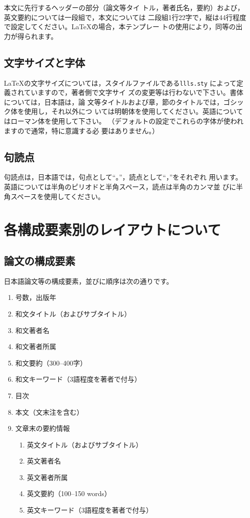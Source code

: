 \documentclass[b5paper,10pt,twocolumn,tombow]{jarticle}
\begin{document}
本文に先行するヘッダーの部分（論文等タイ
トル，著者氏名，要約）および，英文要約については一段組で，本文については
二段組1行22字で，縦は44行程度で設定してください。\LaTeX{}の場合，本テンプレー
トの使用により，同等の出力が得られます。


\subsection{文字サイズと字体}
\LaTeX{}の文字サイズについては，スタイルファイルである\texttt{llls.sty}
によって定義されていますので，著者側で文字サイ
ズの変更等は行わないで下さい。書体については，日本語は，論
文等タイトルおよび章，節のタイトルでは，ゴシック体を使用し，それ以外につ
いては明朝体を使用してください。英語についてはローマン体を使用して下さい。
（デフォルトの設定でこれらの字体が使われますので通常，特に意識する必
要はありません。）

\subsection{句読点}
句読点は，日本語では，句点として``。''，読点として``，''をそれぞれ
用います。英語については半角のピリオドと半角スペース，読点は半角のカンマ並
びに半角スペースを使用してください。

\section{各構成要素別のレイアウトについて}

\subsection{論文の構成要素}
日本語論文等の構成要素，並びに順序は次の通りです。

\begin{enumerate}
  \item 号数，出版年
  \item 和文タイトル（およびサブタイトル）
  \item 和文著者名
  \item 和文著者所属
  \item 和文要約（300--400字）
  \item 和文キーワード（3語程度を著者で付与）
  \item 目次
  \item 本文（文末注を含む）
  \item 文章末の要約情報
  \begin{enumerate}
    \item 英文タイトル（およびサブタイトル）
    \item 英文著者名
    \item 英文著者所属
    \item 英文要約（100--150 words）
    \item 英文キーワード（3語程度を著者で付与）
  \end{enumerate}
\end{enumerate}
\end{document}
